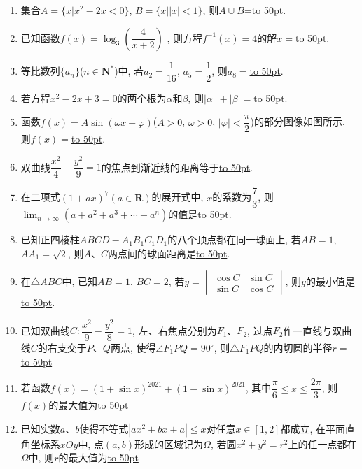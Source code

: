\documentclass[10pt,a4paper]{article}
\newcommand{\blank}[1]{\underline{\hbox to #1pt{}}}
\begin{document}
\begin{enumerate}[1.]
\item 集合$A=\{x|x^2-2x<0\}$, $B=\{x||x|<1\}$, 则$A\cup B$=\blank{50}.
\item 已知函数$f(x)=\log_3(\dfrac 4{x+2})$ , 则方程$f^{-1}(x)=4$的解$x=$\blank{50}.
\item 等比数列$\{a_n\}$($n\in \mathbf{N}^*$)中, 若$a_2=\dfrac 1{16}$, $a_5=\dfrac 12$, 则$a_8=$\blank{50}.
\item 若方程$x^2-2x+3=0$的两个根为$\alpha$和$\beta$, 则$|\alpha |\ +|\beta |=$\blank{50}.
\item 函数$f(x)=A\sin (\omega x+\varphi)$($A>0$, $\omega>0$, $|\varphi|<\dfrac{\pi}2$)的部分图像如图所示, 则$f(x)=$\blank{50}.
\begin{center}
\end{center}
\item 双曲线$\dfrac{x^2}4-\dfrac{y^2}9=1$的焦点到渐近线的距离等于\blank{50}.
\item 在二项式$(1+ax)^7(a\in \mathbf{R})$的展开式中, $x$的系数为$\dfrac 73$, 则$\displaystyle\lim_{n\to \infty}(a+a^2+a^3+\cdots +a^n)$的值是\blank{50}.
\item 已知正四棱柱$ABCD-A_1B_1C_1D_1$的八个顶点都在同一球面上, 若$AB=1$, $AA_1=\sqrt 2$, 则$A$、$C$两点间的球面距离是\blank{50}.
\item 在$\triangle ABC$中, 已知$AB=1$, $BC=2$, 若$y=\begin{vmatrix}
\cos C & \sin C  \\ \sin C  & \cos C  \end{vmatrix}$, 则$y$的最小值是\blank{50}.
\item 已知双曲线$C:\dfrac{x^2}9-\dfrac{y^2}8=1$, 左、右焦点分别为$F_1$、$F_2$, 过点$F_2$作一直线与双曲线$C$的右支交于$P$、$Q$两点, 使得$\angle {F_1}PQ=90^\circ$, 则$\triangle {F_1}PQ$的内切圆的半径$r=$\blank{50}
\item 若函数$f(x)={(1+\sin x)}^{2021}+{(1-\sin x)}^{2021}$, 其中$\dfrac{\pi }6\le x\le \dfrac{2\pi }3$, 则$f(x)$的最大值为\blank{50}
\item 已知实数$a$、$b$使得不等式$|ax^2+bx+a|\le x$对任意$x\in [1,2]$都成立, 在平面直角坐标系$xOy$中, 点$(a,b)$形成的区域记为$\Omega$, 若圆$x^2+y^2=r^2$上的任一点都在$\Omega$中, 则$r$的最大值为\blank{50}


\end{enumerate}
\end{document}
